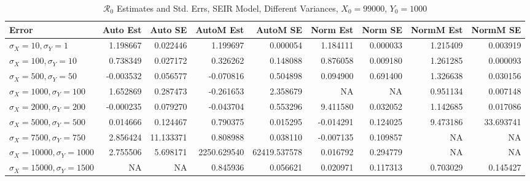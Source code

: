 \documentclass[12pt]{article}
\newcommand{\rr}{\ensuremath{\mathcal{R}_0}}
\begin{document}
\begin{table}[H]
	
	
	\caption{$\rr$ Estimates and Std. Errs, SEIR Model, 
		Different Variances, $X_0 = 99000$, $Y_0 = 1000$}
	\begin{footnotesize}
		\hskip -1.7cm
		\begin{tabular}{l|r|r|r|r|r|r|r|r}
			\hline
			Error & Auto Est & Auto SE & AutoM Est & AutoM SE & Norm Est & Norm SE & NormM Est & NormM SE\\
			\hline
			$\sigma_X = 10, \sigma_Y = 1$ & 1.198667 & 0.022446 & 1.199697 & 0.000054 & 1.184111 & 0.000033 & 1.215409 & 0.003919\\
			\hline
			$\sigma_X = 100, \sigma_Y = 10$ & 0.738349 & 0.027172 & 0.326262 & 0.148088 & 0.876058 & 0.009180 & 1.261285 & 0.000093\\
			\hline
			$\sigma_X = 500, \sigma_Y = 50$ & -0.003532 & 0.056577 & -0.070816 & 0.504898 & 0.094900 & 0.691400 & 1.326638 & 0.030156\\
			\hline
			$\sigma_X = 1000, \sigma_Y = 100$ & 1.652869 & 0.287473 & -0.261653 & 2.358679 & NA & NA & 0.951134 & 0.007148\\
			\hline
			$\sigma_X = 2000, \sigma_Y = 200$ & -0.000235 & 0.079270 & -0.043704 & 0.553296 & 9.411580 & 0.032052 & 1.142685 & 0.017086\\
			\hline
			$\sigma_X = 5000, \sigma_Y = 500$ & 0.014666 & 0.124467 & 0.790375 & 0.015295 & -0.014291 & 0.124025 & 9.473186 & 33.693741\\
			\hline
			$\sigma_X = 7500, \sigma_Y = 750$ & 2.856424 & 11.133371 & 0.808988 & 0.038110 & -0.007135 & 0.109857 & NA & NA\\
			\hline
			$\sigma_X = 10000, \sigma_Y = 1000$ & 2.755506 & 5.698171 & 2250.629540 & 62419.537578 & 0.016792 & 0.294779 & NA & NA\\
			\hline
			$\sigma_X = 15000, \sigma_Y = 1500$ & NA & NA & 0.845936 & 0.056621 & 0.020971 & 0.117313 & 0.703029 & 0.145427\\
			\hline
		\end{tabular}
	\end{footnotesize}
\end{table}
\end{document}
